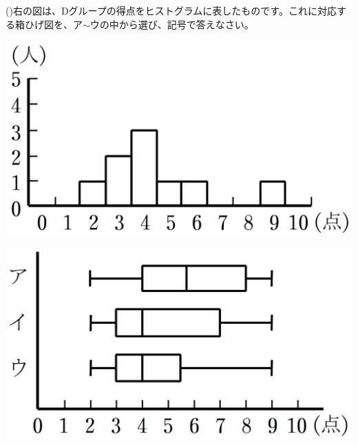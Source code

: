\documentclass[
  12pt,a4paper,lualatex,ja=standard]{bxjsarticle}
\begin{document}
\begin{flushleft}
\vfill

\begin{multicols}{3}
()\hspace{2.5pt}右の図は、Dグループの得点をヒストグラムに表したものです。これに対応する箱ひげ図を、ア$\sim$ウの中から選び、記号で答えなさい。

\columnbreak

\def\@captype{figure}
\includegraphics{img/image3.png}


\columnbreak

\def\@captype{figure}
\includegraphics{img/image2.png}


\end{multicols}

\vfill






















\end{flushleft}
\end{document}
